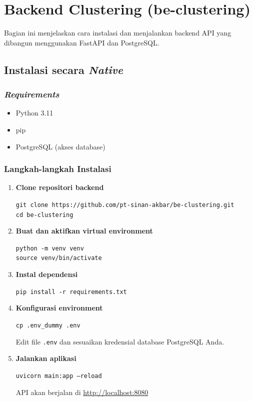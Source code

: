\documentclass{article}
\newcommand{\inlinecode}[1]{%
    \begin{mdframed}[style=codestyle]
    \texttt{\small #1}
    \end{mdframed}
}
\begin{document}
    \section{Backend Clustering (be-clustering)}
    Bagian ini menjelaskan cara instalasi dan menjalankan backend API yang dibangun menggunakan FastAPI dan PostgreSQL.

    \subsection{Instalasi secara \textit{Native}}

    \subsubsection{\textit{Requirements}}
    \begin{itemize}
        \item Python 3.11
        \item pip
        \item PostgreSQL (akses database)
    \end{itemize}

    \subsubsection{Langkah-langkah Instalasi}
    \begin{enumerate}
        \item \textbf{Clone repositori backend}

        \begin{mdframed}[style=codestyle]
            \small\texttt{git clone https://github.com/pt-sinan-akbar/be-clustering.git} \\
            \small\texttt{cd be-clustering}
        \end{mdframed}

        \item \textbf{Buat dan aktifkan virtual environment}

        \begin{mdframed}[style=codestyle]
            \small\texttt{python -m venv venv} \\
            \small\texttt{source venv/bin/activate}
        \end{mdframed}

        \item \textbf{Instal dependensi}

        \inlinecode{pip install -r requirements.txt}

        \item \textbf{Konfigurasi environment}

        \inlinecode{cp .env\_dummy .env}

        Edit file \texttt{.env} dan sesuaikan kredensial database PostgreSQL Anda.

        \item \textbf{Jalankan aplikasi}

        \inlinecode{uvicorn main:app --reload}

        API akan berjalan di \url{http://localhost:8080}
    \end{enumerate}
\end{document}
